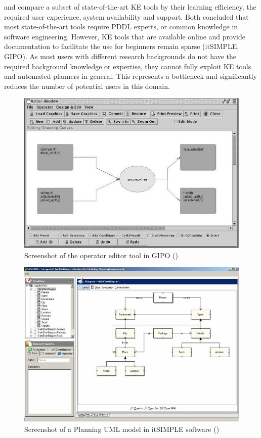 \cite{shah2013knowledge} and \cite{jilani2014automated} compare a subset of state-of-the-art KE tools by their learning efficiency, the required user experience, system availability and support.
Both concluded that most state-of-the-art tools require PDDL experts, or common knowledge in software engineering.
However, KE tools that are available online and provide documentation to facilitate the use for beginners remain sparse (\eg itSIMPLE, GIPO).
As most users with different research backgrounds do not have the required background knowledge or expertise, they cannot fully exploit KE tools and automated planners in general.
This represents a bottleneck and significantly reduces the number of potential users in this domain.

\begin{figure}[h]
	\centering
	\includegraphics[width=0.7\linewidth]{figures/gipoaction}
	\caption{Screenshot of the operator editor tool in GIPO (\cite{mccluskey2005using})}
	\label{fig:gipoaction}
\end{figure}

\begin{figure}[h]
	\centering
	\includegraphics[width=0.7\linewidth]{figures/itsimple}
	\caption{Screenshot of a Planning UML model in itSIMPLE software (\cite{vaquero2013itsimple})}
	\label{fig:itSimple}
\end{figure}

